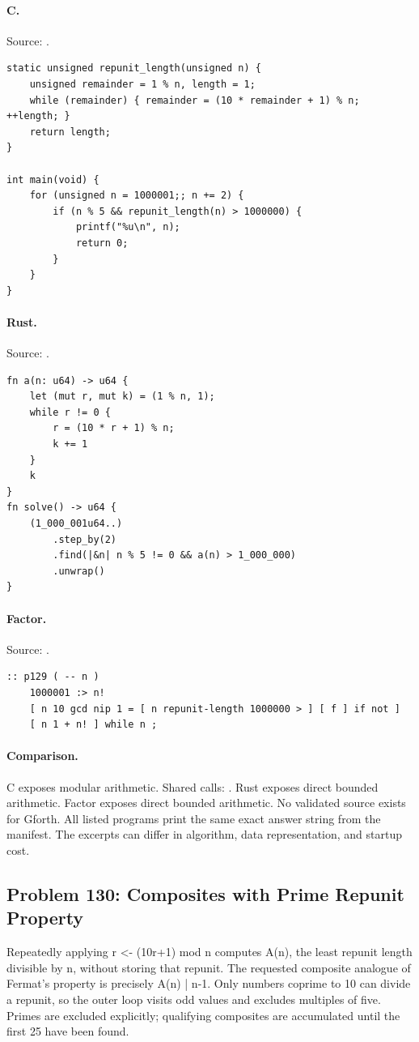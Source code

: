 \paragraph{C.} Source: .
\begin{lstlisting}
static unsigned repunit_length(unsigned n) {
    unsigned remainder = 1 % n, length = 1;
    while (remainder) { remainder = (10 * remainder + 1) % n; ++length; }
    return length;
}

int main(void) {
    for (unsigned n = 1000001;; n += 2) {
        if (n % 5 && repunit_length(n) > 1000000) {
            printf("%u\n", n);
            return 0;
        }
    }
}
\end{lstlisting}

\paragraph{Rust.} Source: .
\begin{lstlisting}
fn a(n: u64) -> u64 {
    let (mut r, mut k) = (1 % n, 1);
    while r != 0 {
        r = (10 * r + 1) % n;
        k += 1
    }
    k
}
fn solve() -> u64 {
    (1_000_001u64..)
        .step_by(2)
        .find(|&n| n % 5 != 0 && a(n) > 1_000_000)
        .unwrap()
}
\end{lstlisting}

\paragraph{Factor.} Source: .
\begin{lstlisting}
:: p129 ( -- n )
    1000001 :> n!
    [ n 10 gcd nip 1 = [ n repunit-length 1000000 > ] [ f ] if not ]
    [ n 1 + n! ] while n ;
\end{lstlisting}

\paragraph{Comparison.}
C exposes modular arithmetic. Shared calls: \texttt{}. Rust exposes direct bounded arithmetic. Factor exposes direct bounded arithmetic.
No validated source exists for Gforth.
All listed programs print the same exact answer string from the manifest. The excerpts can differ in algorithm, data representation, and startup cost.

\subsection{Problem 130: Composites with Prime Repunit Property}
\label{walkthrough:p130}
Repeatedly applying r <- (10r+1) mod n computes A(n), the least repunit length divisible by n, without storing that repunit. The requested composite analogue of Fermat's property is precisely A(n) | n-1. Only numbers coprime to 10 can divide a repunit, so the outer loop visits odd values and excludes multiples of five. Primes are excluded explicitly; qualifying composites are accumulated until the first 25 have been found.

